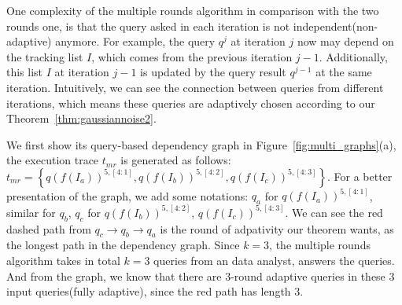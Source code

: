 One complexity of the multiple rounds algorithm in comparison with the two rounds one, is that the query asked in each iteration is not independent(non-adaptive) anymore.
For example, the query $q^{j}$ at iteration $j$ now may depend on the tracking list $I$, which comes from the previous iteration $j-1$. Additionally, this list $I$ at iteration $j-1$ is updated by the query result $q^{j-1}$ at the same iteration. Intuitively, we can see the connection between queries from different iterations, which means these queries are adaptively chosen according to our Theorem~\ref{thm:gaussiannoise2}.

%

We first show its query-based dependency graph in Figure~\ref{fig:multi_graphs}(a), the execution trace $t_{mr}$ is generated as follows:
$
 t_{mr} = \left\{
q(f( I_a))^{5, [4:1]}, 
q(f( I_b))^{5, [4:2]},
q(f( I_c))^{5, [4:3]}
\right \}
$.
For a better presentation of the graph, we add some notations: $q_a$ for $q(f( I_a))^{5, [4:1]}$, similar for $q_b$, $q_c$ for $q(f( I_b))^{5, [4:2]}$, $q(f( I_c))^{5, [4:3]}$. We can see the red dashed path from $q_c \to q_b \to q_a$ is the round of adpativity our theorem wants, as the longest path in the dependency graph. Since $k =3$, the multiple rounds algorithm takes in total $k=3$ queries from an data analyst, answers the queries. And from the graph, we know that there are 3-round adaptive queries in these 3 input queries(fully adaptive), since the red path has length $3$. 

